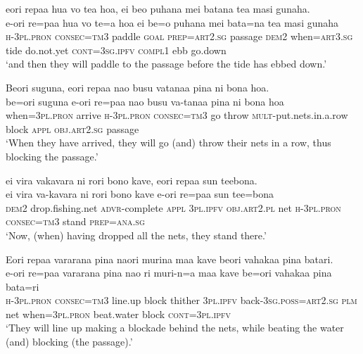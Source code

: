 \ea\label{ex:text25-5}
eori repaa hua vo tea hoa, ei beo puhana mei batana tea masi gunaha.\\
\gll e-ori	re=paa	hua	vo	te=a	hoa	ei	be=o	puhana	mei	bata=na	tea	masi	gunaha\\
     \textsc{h}-3\textsc{pl}.\textsc{pron}	\textsc{consec}=\textsc{tm}3	paddle	\textsc{goal}	\textsc{prep}=\textsc{art}2.\textsc{sg}	passage	\textsc{dem}2	when=\textsc{art}3.\textsc{sg}	tide	do.not.yet	\textsc{cont}=3\textsc{sg}.\textsc{ipfv}	\textsc{compl}1	ebb	go.down\\
\glt `and then they will paddle to the passage before the tide has ebbed down.'
\z

\ea\label{ex:text25-6}
Beori suguna, eori repaa nao busu vatanaa pina ni bona hoa.\\
\gll be=ori	suguna	e-ori	re=paa	nao	busu	va-tanaa	pina	ni	bona	hoa\\
     when=3\textsc{pl}.\textsc{pron}	arrive	\textsc{h}-3\textsc{pl}.\textsc{pron}	\textsc{consec}=\textsc{tm}3	go	throw	\textsc{mult}-put.nets.in.a.row	block	\textsc{appl}	\textsc{obj}.\textsc{art}2.\textsc{sg}	passage\\
\glt `When they have arrived, they will go (and) throw their nets in a row, thus blocking the passage.'
\z

\ea\label{ex:text25-7}
ei vira vakavara ni rori bono kave, eori repaa sun teebona.\\
\gll ei	vira	va-kavara	ni	rori	bono	kave	e-ori	re=paa	sun	tee=bona\\
     \textsc{dem}2	drop.fishing.net	\textsc{advr}-complete	\textsc{appl}	3\textsc{pl}.\textsc{ipfv}	\textsc{obj}.\textsc{art}2.\textsc{pl}	net	\textsc{h}-3\textsc{pl}.\textsc{pron}	\textsc{consec}=\textsc{tm}3	stand	\textsc{prep}=\textsc{ana}.\textsc{sg}\\
\glt `Now, (when) having dropped all the nets, they stand there.'
\z

\ea\label{ex:text25-8}
Eori repaa vararana pina naori murina maa kave beori vahakaa pina batari.\\
\gll e-ori	re=paa	vararana	pina	nao	ri	muri-n=a	maa	kave	be=ori	vahakaa	pina	bata=ri\\
     \textsc{h}-3\textsc{pl}.\textsc{pron}	\textsc{consec}=\textsc{tm}3	line.up	block	thither	3\textsc{pl}.\textsc{ipfv}	back-3\textsc{sg}.\textsc{poss}=\textsc{art}2.\textsc{sg}	\textsc{plm}	net	when=3\textsc{pl}.\textsc{pron}	beat.water	block	\textsc{cont}=3\textsc{pl}.\textsc{ipfv}\\
\glt `They will line up making a blockade behind the nets, while beating the water (and) blocking (the passage).'
\z

